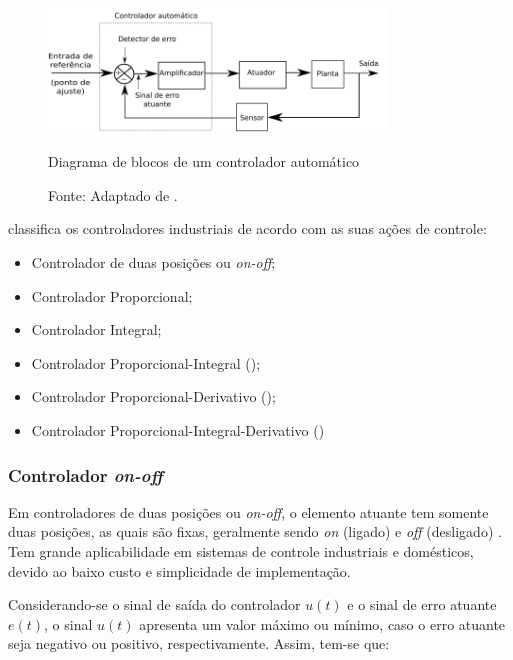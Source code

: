 \begin{figure}[h!]
 \centering
 \captionsetup{width=0.8\textwidth,font=footnotesize,textfont=bf}
 \includegraphics[width=0.8\textwidth,height=0.5\textheight,keepaspectratio]{figuras/Controlador.png}
 \caption{Diagrama de blocos de um controlador automático \label{fig:controlador}}
 \vspace{-0.2cm}
 \caption*{Fonte: Adaptado de \cite[p.18]{ogata}.}
\end{figure}

 classifica os controladores industriais de acordo com as suas ações de controle:
\begin{itemize}
 \item Controlador de duas posições ou \textit{on-off}; %
 \item Controlador Proporcional;
 \item Controlador Integral;
 \item Controlador Proporcional-Integral ();
 \item Controlador Proporcional-Derivativo ();
 \item Controlador Proporcional-Integral-Derivativo ()
\end{itemize}

\subsubsection{Controlador \textit{on-off}}

Em controladores de duas posições ou \textit{on-off}, o elemento atuante tem somente duas posições, as quais são fixas, geralmente sendo 
\textit{on} (ligado) e \textit{off} (desligado) \cite{ogata}. Tem grande aplicabilidade em sistemas de controle industriais e 
domésticos, devido ao baixo custo e simplicidade de implementação.

Considerando-se o sinal de saída do controlador $u(t)$ %
e o sinal de erro atuante $e(t)$, o sinal $u(t)$ apresenta um valor máximo ou mínimo, caso o erro atuante seja negativo ou positivo, 
respectivamente. Assim, tem-se que:

